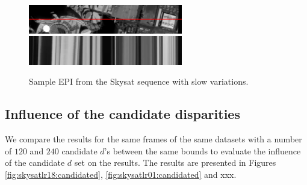 \documentclass{article}
\def\epiWidth{0.6}
\theoremstyle{definition}
\begin{document}
\begin{figure}[ht]
  \centering
  \includegraphics[width=\epiWidth\textwidth]{images/1521592293547_1st.png}\\
  \includegraphics[width=\epiWidth\textwidth]{images/1521592293547_epi.png}
  \caption{Sample EPI from the Skysat sequence with slow variations.}
  \label{fig:epi:skysat1}
\end{figure}


\subsection{Influence of the candidate disparities}


We compare the results for the same frames of the same datasets with a number of $120$ and $240$ candidate $d$'s between the same bounds to evaluate the influence of the candidate $d$ set on the results. The results are presented in Figures \ref{fig:skysatlr18:candidated}, \ref{fig:skysatlr01:candidated} and xxx.
\end{document}
